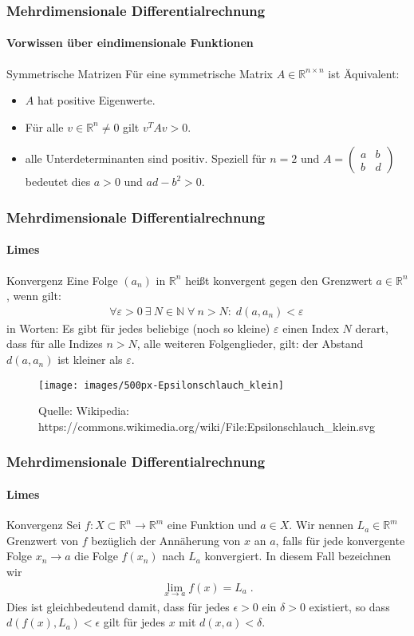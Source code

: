 \documentclass{beamer}
\begin{document}
\begin{frame}
    \frametitle{Mehrdimensionale Differentialrechnung}
\framesubtitle{Vorwissen über eindimensionale  Funktionen}
    \begin{block}{Symmetrische Matrizen}
 Für eine symmetrische Matrix $A \in \mathbb{R}^{n \times n}$ ist Äquivalent:
\begin{itemize}
\item $A$ hat positive Eigenwerte.
\item Für alle $v \in \mathbb{R}^n \neq 0$ gilt  $v^TA v > 0 $.
\item alle Unterdeterminanten sind positiv. Speziell für $n=2$ und $A = \begin{pmatrix} a & b \\ b & d\end{pmatrix}$ bedeutet dies
$a >0$ und $ad -b^2 >0$. 
\end{itemize}
\end{block}

 \end{frame}


\begin{frame}
    \frametitle{Mehrdimensionale Differentialrechnung}
\framesubtitle{Limes}
    \begin{block}{Konvergenz}
Eine Folge $(a_n)$ in $\mathbb{R}^n$ heißt konvergent gegen den Grenzwert $a \in \mathbb{R}^n$, wenn gilt:
\begin{align*}
\forall {\varepsilon > 0} \ \exists \ N \in \mathbb{N} \; \forall \ n > N: \; d(a, a_n) < \varepsilon\,
\end{align*}
in Worten: Es gibt für jedes beliebige (noch so kleine) $\varepsilon$ einen Index $N$ derart, dass für alle Indizes $n > N$, alle weiteren Folgenglieder, gilt: der Abstand $d(a, a_n)$ ist kleiner als $\varepsilon$.
\end{block}
\begin{figure}[H]
      \centering
    \texttt{[image: images/500px-Epsilonschlauch\_klein]}
      \caption{Quelle: Wikipedia: https://commons.wikimedia.org/wiki/File:Epsilonschlauch\_klein.svg}
\end{figure}

 \end{frame}

\begin{frame}
    \frametitle{Mehrdimensionale Differentialrechnung}
\framesubtitle{Limes}
    \begin{block}{Konvergenz}
Sei $f :X \subset \mathbb{R}^n \to \mathbb{R}^m$ eine  Funktion und $a \in X$. Wir nennen $L_a \in \mathbb{R}^m$ Grenzwert von $f$ bezüglich der Annäherung von $x$ an $a$, falls für jede  konvergente Folge $x_n \to a$  die Folge $f(x_n)$ nach $L_a$ konvergiert.  In diesem Fall bezeichnen wir
\begin{align*}
\lim_{x \to a} f(x) = L_a \;.
\end{align*}
Dies ist gleichbedeutend damit, dass für jedes $\epsilon > 0$ ein $\delta > 0$ existiert, so dass
$d(f(x) ,L_a) < \epsilon$ gilt für jedes $x$ mit $d(x, a) < \delta$.
\end{block}


 \end{frame}
\end{document}
